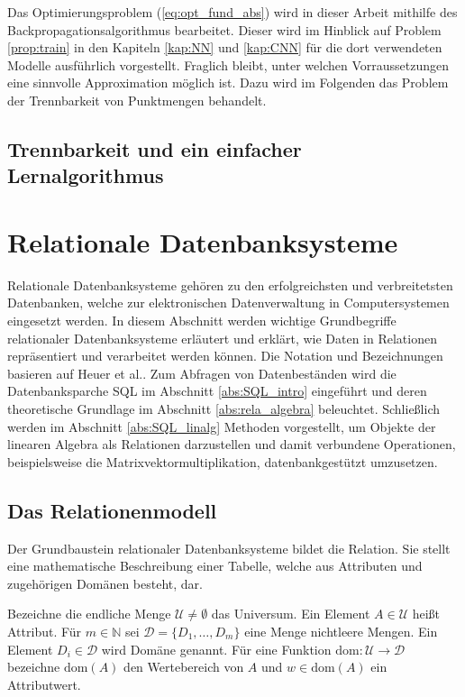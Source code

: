 Das Optimierungsproblem (\ref{eq:opt_fund_abs}) wird in dieser Arbeit mithilfe des Backpropagationsalgorithmus bearbeitet. Dieser wird im Hinblick auf Problem \ref{prop:train} in den Kapiteln \ref{kap:NN} und \ref{kap:CNN} für die dort verwendeten Modelle ausführlich vorgestellt. Fraglich bleibt, unter welchen Vorraussetzungen eine sinnvolle Approximation möglich ist. Dazu wird im Folgenden das Problem der Trennbarkeit von Punktmengen behandelt.
\subsection{Trennbarkeit und ein einfacher Lernalgorithmus}
\label{abs:trenn}
\section{Relationale Datenbanksysteme}
\label{abs:relation_intro}
Relationale Datenbanksysteme gehören zu den erfolgreichsten und verbreitetsten Datenbanken, welche zur elektronischen Datenverwaltung in Computersystemen eingesetzt werden. In diesem Abschnitt werden wichtige Grundbegriffe relationaler Datenbanksysteme erläutert und erklärt, wie Daten in Relationen repräsentiert und verarbeitet werden können. Die Notation und Bezeichnungen basieren auf Heuer et al.\cite{DBLP:books/daglib/0044627}. Zum Abfragen von Datenbeständen wird die Datenbanksparche SQL im Abschnitt \ref{abs:SQL_intro} eingeführt und deren theoretische Grundlage im Abschnitt \ref{abs:rela_algebra} beleuchtet. Schließlich werden im Abschnitt \ref{abs:SQL_linalg} Methoden vorgestellt, um Objekte der linearen Algebra als Relationen darzustellen und damit verbundene Operationen, beispielsweise die Matrixvektormultiplikation, datenbankgestützt umzusetzen.

\subsection{Das Relationenmodell}
Der Grundbaustein relationaler Datenbanksysteme bildet die Relation. Sie stellt eine mathematische Beschreibung einer Tabelle, welche aus Attributen und zugehörigen Domänen besteht, dar.

\begin{defi}
    \label{def:universum}
    Bezeichne die endliche Menge $\mathcal{U} \neq \emptyset$ das Universum. Ein Element $A \in \mathcal{U}$ heißt Attribut. Für $m \in \mathbb{N}$ sei $\mathcal{D}=\{D_1, \ldots, D_m\}$ eine Menge nichtleere Mengen. Ein Element $D_i \in \mathcal{D}$ wird Domäne genannt. Für eine Funktion $\mathrm{dom}: \mathcal{U} \rightarrow \mathcal{D}$ bezeichne $\mathrm{dom}(A)$ den Wertebereich von $A$ und $w \in \mathrm{dom}(A)$ ein Attributwert.
\end{defi}

